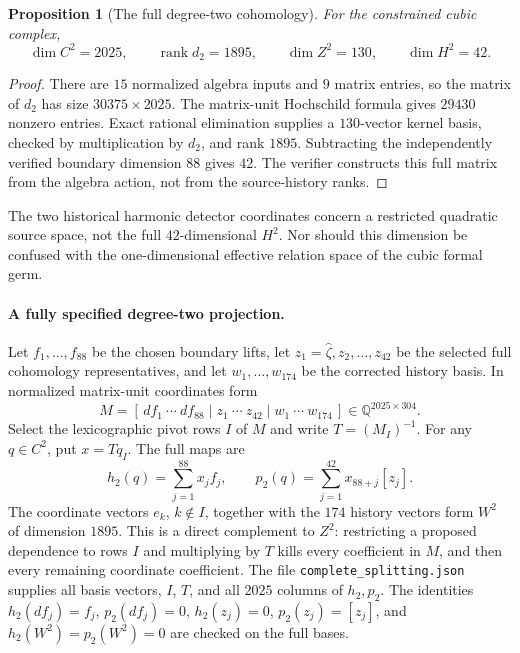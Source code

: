 \documentclass[11pt]{amsart}
\newtheorem{proposition}[theorem]{Proposition}
\newcommand{\rank}{\operatorname{rank}}
\newcommand{\Q}{\mathbb Q}
\begin{document}
\begin{proposition}[The full degree-two cohomology]\label{prop:full-cubic-H2}
For the constrained cubic complex,
\[
\dim C^2=2025,\qquad \rank d_2=1895,\qquad
\dim Z^2=130,\qquad \dim H^2=42.
\]
\end{proposition}
\begin{proof}
There are $15$ normalized algebra inputs and $9$ matrix entries, so the matrix
of $d_2$ has size $30375\times2025$. The matrix-unit Hochschild formula gives
$29430$ nonzero entries. Exact rational elimination supplies a $130$-vector
kernel basis, checked by multiplication by $d_2$, and rank $1895$.
Subtracting the independently verified boundary dimension $88$ gives $42$.
The verifier constructs this full matrix from the algebra action, not from
the source-history ranks.
\end{proof}

The two historical harmonic detector coordinates concern a restricted
quadratic source space, not the full $42$-dimensional $H^2$. Nor should this
dimension be confused with the one-dimensional effective relation space of
the cubic formal germ.

\paragraph{A fully specified degree-two projection.}
Let $f_1,\ldots,f_{88}$ be the chosen boundary lifts, let
$z_1=\widehat\zeta,z_2,\ldots,z_{42}$ be the selected full cohomology
representatives, and let $w_1,\ldots,w_{174}$ be the corrected history basis.
In normalized matrix-unit coordinates form
\[
M=[\,df_1\ \cdots\ df_{88}\mid z_1\ \cdots\ z_{42}
       \mid w_1\ \cdots\ w_{174}\,]\in\Q^{2025\times304}.
\]
Select the lexicographic pivot rows $I$ of $M$ and write $T=(M_I)^{-1}$.
For any $q\in C^2$, put $x=Tq_I$. The full maps are
\[
h_2(q)=\sum_{j=1}^{88}x_j f_j,\qquad
p_2(q)=\sum_{j=1}^{42}x_{88+j}[z_j].
\]
The coordinate vectors $e_k$, $k\notin I$, together with the $174$ history
vectors form $W^2$ of dimension $1895$. This is a direct complement to $Z^2$:
restricting a proposed dependence to rows $I$ and multiplying by $T$ kills
every coefficient in $M$, and then every remaining coordinate coefficient.
The file \texttt{complete\_splitting.json} supplies all basis vectors, $I$, $T$,
and all $2025$ columns of $h_2,p_2$. The identities $h_2(df_j)=f_j$,
$p_2(df_j)=0$, $h_2(z_j)=0$, $p_2(z_j)=[z_j]$, and
$h_2(W^2)=p_2(W^2)=0$ are checked on the full bases.
\end{document}
